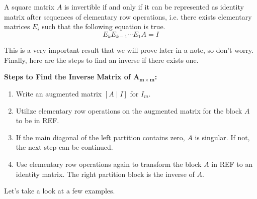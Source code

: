 \documentclass[../main.tex]{subfiles}
\begin{document}
\begin{definition}
A square matrix $A$ is invertible if and only if it can be represented
as identity matrix after sequences of elementary row operations, i.e.
there exists elementary matrices $E_i$ such that the following
equation is true.
\[
E_k E_{k-1} \cdots E_1 A = I
\]
\end{definition}

This is a very important result that we will prove later in a note,
so don't worry. Finally, here are the steps to find an inverse if
there exists one.

\begin{definition}
\textbf{Steps to Find the Inverse Matrix of
$\mathbf{A_{m \times m}}$:}
\begin{enumerate}[noitemsep]
\item
Write an augmented matrix $[A \mid I]$ for $I_{m}$.
\item
Utilize elementary row operations on the augmented matrix for
the block $A$ to be in REF.
\item
If the main diagonal of the left partition contains zero,
$A$ is singular. If not, the next step can be continued.
\item
Use elementary row operations again to transform the block $A$
in REF to an identity matrix. The right partition block is
the inverse of $A$.
\end{enumerate}
\end{definition}

Let's take a look at a few examples.
\end{document}
